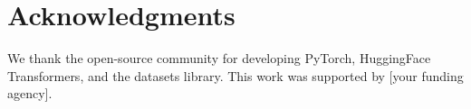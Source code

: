 \section*{Acknowledgments}
We thank the open-source community for developing PyTorch, HuggingFace Transformers, and the datasets library. This work was supported by [your funding agency].


